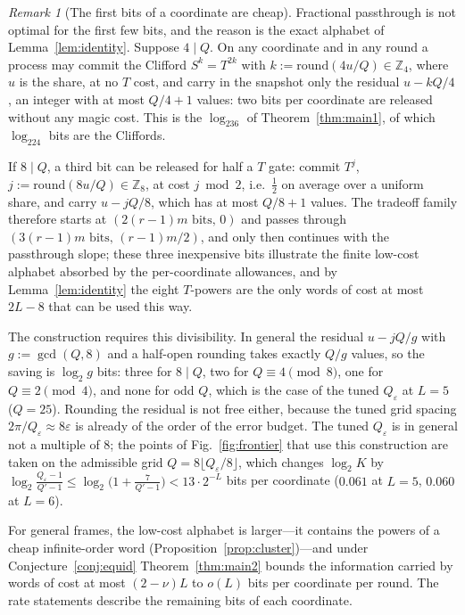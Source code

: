 \documentclass[aps,prx,twocolumn,superscriptaddress,nofootinbib,longbibliography]{revtex4-2}
\theoremstyle{plain}
\theoremstyle{definition}
\theoremstyle{remark}
\newtheorem{remark}{Remark}
\newcommand{\Z}{\mathbb{Z}}
\begin{document}
\begin{remark}[The first bits of a coordinate are cheap]\label{rem:firstbit}
Fractional passthrough is not optimal for the first few bits, and the reason is the exact alphabet of Lemma~\ref{lem:identity}. Suppose $4\mid Q$. On any coordinate and in any round a process may commit the Clifford $S^{k}=T^{2k}$ with $k:=\mathrm{round}(4u/Q)\in\Z_4$, where $u$ is the share, at no $T$ cost, and carry in the snapshot only the residual $u-kQ/4$, an integer with at most $Q/4+1$ values: two bits per coordinate are released without any magic cost. This is the $\log_236$ of Theorem~\ref{thm:main1}, of which $\log_224$ bits are the Cliffords. 

If $8\mid Q$, a third bit can be released for half a $T$ gate: commit $T^{j}$, $j:=\mathrm{round}(8u/Q)\in\Z_8$, at cost $j\bmod2$, i.e.\ $\tfrac12$ on average over a uniform share, and carry $u-jQ/8$, which has at most $Q/8+1$ values. The tradeoff family therefore starts at $(2(r-1)m\text{ bits},\,0)$ and passes through $(3(r-1)m\text{ bits},\,(r-1)m/2)$, and only then continues with the passthrough slope; these three inexpensive bits illustrate the finite low-cost alphabet absorbed by the per-coordinate allowances, and by Lemma~\ref{lem:identity} the eight $T$-powers are the only words of cost at most $2L-8$ that can be used this way. 

The construction requires this divisibility. In general the residual $u-jQ/g$ with $g:=\gcd(Q,8)$ and a half-open rounding takes exactly $Q/g$ values, so the saving is $\log_2g$ bits: three for $8\mid Q$, two for $Q\equiv4\pmod 8$, one for $Q\equiv2\pmod 4$, and none for odd $Q$, which is the case of the tuned $Q_\varepsilon$ at $L=5$ ($Q=25$). Rounding the residual is not free either, because the tuned grid spacing $2\pi/Q_\varepsilon\approx8\varepsilon$ is already of the order of the error budget. The tuned $Q_\varepsilon$ is in general not a multiple of $8$; the points of Fig.~\ref{fig:frontier} that use this construction are taken on the admissible grid $Q=8\lfloor Q_\varepsilon/8\rfloor$, which changes $\log_2K$ by $\log_2\frac{Q_\varepsilon-1}{Q'-1}\le\log_2\big(1+\tfrac7{Q'-1}\big)<13\cdot2^{-L}$ bits per coordinate ($0.061$ at $L=5$, $0.060$ at $L=6$). 

For general frames, the low-cost alphabet is larger---it contains the powers of a cheap infinite-order word (Proposition~\ref{prop:cluster})---and under Conjecture~\ref{conj:equid} Theorem~\ref{thm:main2} bounds the information carried by words of cost at most $(2-\nu)L$ to $o(L)$ bits per coordinate per round. The rate statements describe the remaining bits of each coordinate.
\end{remark}
\end{document}
